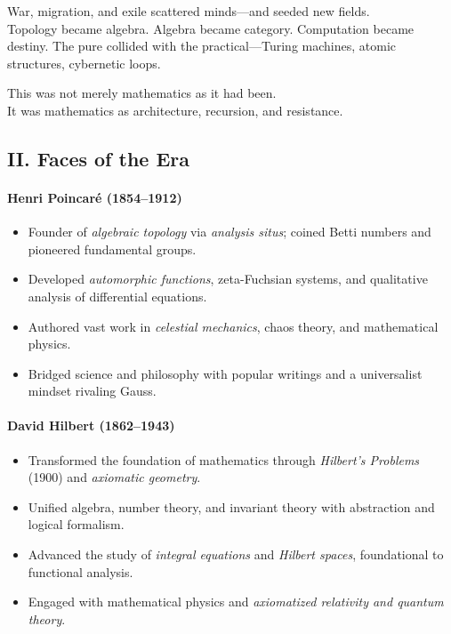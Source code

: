 \documentclass[9pt]{article}
\begin{document}
\noindent
War, migration, and exile scattered minds—and seeded new fields. \\
Topology became algebra. Algebra became category. Computation became destiny. The pure collided with the practical—Turing machines, atomic structures, cybernetic loops.

\medskip

\noindent
This was not merely mathematics as it had been. \\
It was mathematics as architecture, recursion, and resistance.

\newpage

\subsection*{II. Faces of the Era}

\paragraph{Henri Poincaré (1854--1912)}
\begin{itemize}
  \item Founder of \textit{algebraic topology} via \textit{analysis situs}; coined Betti numbers and pioneered fundamental groups.
  \item Developed \textit{automorphic functions}, zeta-Fuchsian systems, and qualitative analysis of differential equations.
  \item Authored vast work in \textit{celestial mechanics}, chaos theory, and mathematical physics.
  \item Bridged science and philosophy with popular writings and a universalist mindset rivaling Gauss.
\end{itemize}

\paragraph{David Hilbert (1862--1943)}
\begin{itemize}
  \item Transformed the foundation of mathematics through \textit{Hilbert’s Problems} (1900) and \textit{axiomatic geometry}.
  \item Unified algebra, number theory, and invariant theory with abstraction and logical formalism.
  \item Advanced the study of \textit{integral equations} and \textit{Hilbert spaces}, foundational to functional analysis.
  \item Engaged with mathematical physics and \textit{axiomatized relativity and quantum theory}.
\end{itemize}
\end{document}
